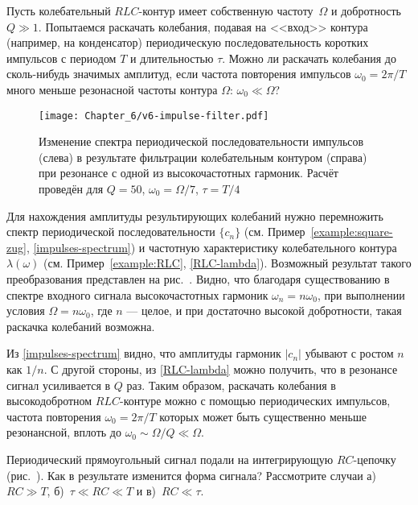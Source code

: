 \begin{lab:example}\label{example:zug-RLC}
Пусть колебательный $RLC$-контур имеет собственную
частоту~$\Omega$ и добротность $Q\gg 1$. Попытаемся раскачать колебания,
подавая на <<вход>> контура (например, на конденсатор) периодическую 
последовательность коротких импульсов с периодом $T$ и длительностью 
$\tau$. Можно ли раскачать колебания до сколь-нибудь значимых амплитуд, 
если частота повторения импульсов $\omega_0=2\pi/T$ много меньше 
резонасной частоты контура $\Omega$: $\omega_0\ll \Omega$?

\begin{figure}[h!]
 \centering\texttt{[image: Chapter\_6/v6-impulse-filter.pdf]}
 \caption{\footnotesize Изменение спектра периодической последовательности импульсов (слева)
 в результате фильтрации колебательным контуром (справа) при резонансе с одной
 из высокочастотных гармоник. Расчёт проведён
 для $Q=50$, $\omega_0=\Omega/7$, $\tau=T/4$}
\end{figure}

Для нахождения амплитуды результирующих колебаний нужно перемножить
спектр периодической последовательности $\{c_n\}$
(см. Пример~\ref{example:square-zug}, \eqref{impulses-spectrum})
и частотную характеристику колебательного контура $\lambda(\omega)$
(см. Пример~\ref{example:RLC}, \eqref{RLC-lambda}).
Возможный результат такого преобразования представлен на рис.~.
Видно, что благодаря существованию в спектре входного сигнала высокочастотных
гармоник $\omega_n = n \omega_0$, при выполнении условия
$\Omega = n \omega_0$, где $n$ --- целое, и при достаточно высокой добротности,
такая раскачка колебаний возможна.

Из \eqref{impulses-spectrum} видно, что амплитуды гармоник $|c_n|$ убывают
с ростом $n$ как $1/n$. С другой стороны, из \eqref{RLC-lambda} можно получить,
что в резонансе сигнал усиливается в $Q$ раз.
Таким образом, раскачать колебания в высокодобротном $RLC$-контуре можно
с помощью периодических импульсов, частота повторения $\omega_0=2\pi/T$
которых может быть существенно меньше резонансной,
вплоть до $\omega_0 \sim \Omega / Q \ll \Omega $.
\end{lab:example}

\begin{lab:exercise}
Периодический прямоугольный сигнал подали на интегрирующую $RC$-цепочку
(рис.~). Как в результате изменится форма сигнала?
Рассмотрите случаи а)~$RC \gg T$, б)~$\tau \ll RC \ll T$ и
в)~$RC \ll \tau$.
\end{lab:exercise}

